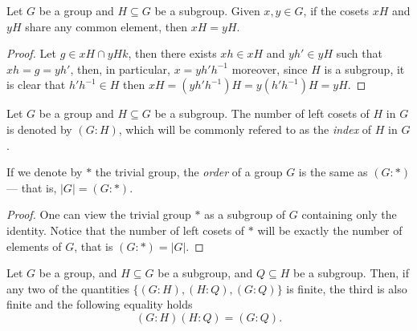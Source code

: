 \begin{corollary}
\label{cor:equal-cosets}
Let \(G\) be a group and \(H \subseteq G\) be a subgroup. Given \(x, y \in G\),
if the cosets \(x H\) and \(y H\) share any common element, then \(x H = y H\).
\end{corollary}

\begin{proof}
Let \(g \in xH \cap yHk\), then there exists \(x h \in xH\) and \(y h' \in yH\)
such that \(x h = g = y h'\), then, in particular, \(x = y h' h^{-1}\) moreover,
since \(H\) is a subgroup, it is clear that \(h' h^{-1} \in H\) then \(x H = (y
h' h^{-1})H = y(h' h^{-1})H = y H\).
\end{proof}

\begin{definition}[Index]
\label{def:grp-index}
Let \(G\) be a group and \(H \subseteq G\) be a subgroup. The number of left
cosets of \(H\) in \(G\) is denoted by \((G : H)\), which will be commonly
refered to as the \emph{index} of \(H\) in \(G\).
\end{definition}

\begin{corollary}
\label{cor:order-as-index}
If we denote by \(*\) the trivial group, the \emph{order} of a group
\(G\) is the same as \((G : *)\) --- that is, \(|G| = (G : *)\).
\end{corollary}

\begin{proof}
One can view the trivial group \(*\) as a subgroup of \(G\) containing only the
identity. Notice that the number of left cosets of \(*\) will be exactly the
number of elements of \(G\), that is \((G : *) = |G|\).
\end{proof}

\begin{proposition}
\label{prop:grp-index-subgroup}
Let \(G\) be a group, and \(H \subseteq G\) be a subgroup, and \(Q \subseteq H\)
be a subgroup. Then, if any two of the quantities \(\{(G : H), (H : Q), (G :
Q)\}\) is finite, the third is also finite and the following equality holds
\[
  (G : H) (H : Q) = (G : Q).
\]
\end{proposition}

